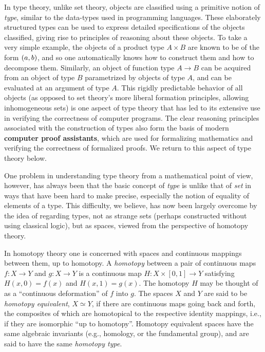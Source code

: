 In type theory, unlike set theory, objects are classified using a primitive notion of \emph{type}, similar to the data-types used in programming languages.  These elaborately structured types can be used to express detailed specifications of the objects classified, giving rise to principles of reasoning about these objects.  To take a very simple example, the objects of a product type $A\times B$ are known to be of the form ${(a,b)}$, and so one automatically knows how to construct them and how to decompose them. Similarly, an object of function type $A\to B$ can be acquired from an object of type $B$ parametrized by objects of type $A$, and can be evaluated at an argument of type $A$.  This rigidly predictable behavior of all objects (as opposed to set theory's more liberal formation principles, allowing inhomogeneous sets) is one aspect of type theory that has led to its extensive use in verifying the correctness of computer programs.  The clear reasoning principles associated with the construction of types also form the basis of modern {\bf computer proof assistants}, which are used for formalizing mathematics and verifying the correctness of formalized proofs.  We return to this aspect of type theory below.  



One problem in understanding type theory from a mathematical point of view, however, has always been that the basic concept of \emph{type} is unlike that of \emph{set} in ways that have been hard to make precise, especially the notion of equality of elements of a type.  This difficulty, we believe, has now been largely overcome by the idea of regarding types, not as strange sets (perhaps constructed without using classical logic), but as spaces, viewed from the perspective of homotopy theory. 

In homotopy theory one is concerned with spaces and continuous mappings between them, 
up to homotopy.  A \emph{homotopy} between a pair of continuous maps $f \colon X \to Y$
and  $g \colon X\to Y$ is 
a continuous map $H \colon X \times [0, 1] \to Y$ satisfying
$H(x, 0) = f (x)$  and $H(x, 1) = g(x)$. The homotopy $H$ may be thought of as a ``continuous deformation'' of $f$ into $g$. The spaces $X$ and $Y$ are said to be \emph{homotopy equivalent}, $X\simeq Y$, if there are continuous maps going back and forth, the composites of which are homotopical to the respective identity mappings, i.e., if they are isomorphic ``up to homotopy''.  Homotopy equivalent spaces have the same algebraic invariants (e.g., homology, or the fundamental group), and are said to have the same \emph{homotopy type}.

